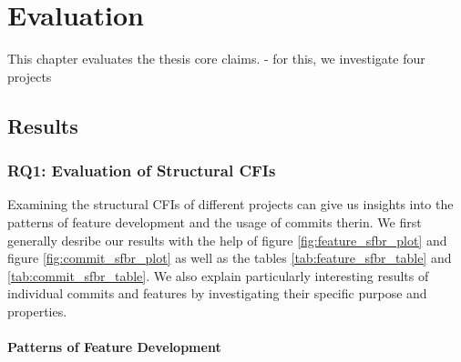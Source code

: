 \chapter{Evaluation}\label{ch:evaluation}

This chapter evaluates the thesis core claims.
- for this, we investigate four projects

\section{Results}\label{sec:results}

\subsection*{\textbf{RQ1: Evaluation of Structural CFIs}}\label{sec:eval_struc_cfis}

Examining the structural CFIs of different projects can give us insights into the patterns of feature development and the usage of commits therin.
We first generally desribe our results with the help of figure \ref{fig:feature_sfbr_plot} and figure \ref{fig:commit_sfbr_plot} as well as the tables \ref{tab:feature_sfbr_table} and \ref{tab:commit_sfbr_table}.
We also explain particularly interesting results of individual commits and features by investigating their specific purpose and properties.

\subsubsection*{Patterns of Feature Development}\label{sec:eval_feature_development}

